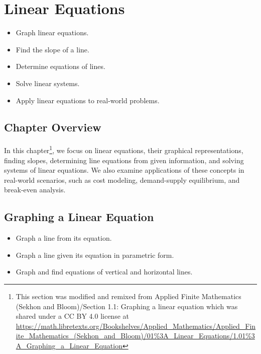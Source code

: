 



\chapter{Linear Equations}
\begin{outcome}
\begin{itemize}
\item Graph linear equations.
\item Find the slope of a line.
\item Determine equations of lines.
\item Solve linear systems.
\item Apply linear equations to real-world problems.
\end{itemize}
\end{outcome}

\section*{Chapter Overview}
In this chapter\footnote{This section was modified and remixed from 
Applied Finite Mathematics (Sekhon and Bloom)/Section 1.1: Graphing a linear equation which was shared under a CC BY 4.0 license at 
\url{https://math.libretexts.org/Bookshelves/Applied_Mathematics/Applied_Finite_Mathematics_(Sekhon_and_Bloom)/01\%3A_Linear_Equations/1.01\%3A_Graphing_a_Linear_Equation}
}, 
we focus on linear equations, their graphical representations, finding slopes, determining line equations from given information, and solving systems of linear equations. We also examine applications of these concepts in real-world scenarios, such as cost modeling, demand-supply equilibrium, and break-even analysis.

\section{Graphing a Linear Equation}
\begin{outcome}
\begin{itemize}
\item Graph a line from its equation.
\item Graph a line given its equation in parametric form.
\item Graph and find equations of vertical and horizontal lines.
\end{itemize}
\end{outcome}

